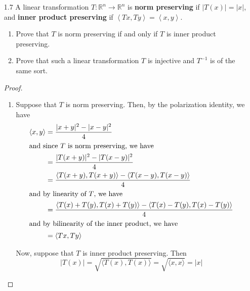 \begin{enumerate}
    \pagebreak
    
    \item[1.7] A linear transformation \( T: \mathbb{R}^n \rightarrow \mathbb{R}^n \) is \textbf{norm preserving} if \( \vert T(x) \vert = \vert x \vert \), and \textbf{inner product preserving} if \( \left< Tx, Ty \right> = \left< x,y \right> \).
    \begin{enumerate}
        \item Prove that \( T \) is norm preserving if and only if \( T \) is inner product preserving.
        
        \item Prove that such a linear transformation \( T \) is injective and \( T^{-1} \) is of the same sort.
    \end{enumerate}
    
    \begin{proof}
    \begin{enumerate}
        \item Suppose that \( T \) is norm preserving. Then, by the polarization identity, we have
        \begin{align*}
            \langle x,y \rangle &= \frac{\vert x+y \vert^2-\vert x-y \vert^2}{4} \\
            \intertext{and since \( T \) is norm preserving, we have}
            &= \frac{\vert T(x+y) \vert ^2 - \vert T(x-y) \vert ^2}{4} \\
            &= \frac{\langle T(x+y), T(x+y) \rangle - \langle T(x-y), T(x-y) \rangle}{4} \\
            \intertext{and by linearity of \( T \), we have}
            &= \frac{\langle T(x) + T(y), T(x) + T(y) \rangle - \langle T(x) - T(y), T(x) - T(y) \rangle}{4} \\
            \intertext{and by bilinearity of the inner product, we have} 
            &= \langle Tx, Ty \rangle
        \end{align*}
        
        Now, suppose that \( T \) is inner product preserving. Then
        \[
        \left| T(x) \right| = \sqrt{\langle T(x), T(x) \rangle} = \sqrt{\langle x, x \rangle} = \vert x \vert
        \]
        

\end{enumerate}
\end{proof}
\end{enumerate}
